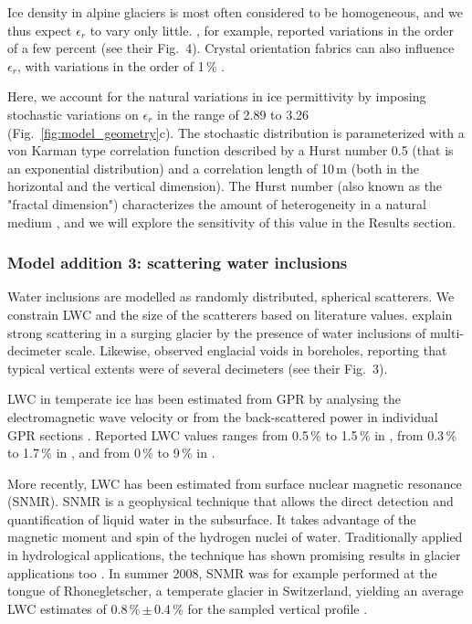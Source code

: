 Ice density in alpine glaciers is most often considered to be homogeneous, and we thus expect $\epsilon_r$ to vary only little. \citet{Bohleber2012}, for example, reported variations in the order of a few percent (see their Fig.~4). Crystal orientation fabrics can also influence $\epsilon_r$, with variations in the order of 1\,\% \citep{Johari&Charette1975,Fujita&al1993}.

Here, we account for the natural variations in ice permittivity by imposing stochastic variations on $\epsilon_r$ in the range of 2.89 to 3.26 (Fig.~\ref{fig:model_geometry}c). The stochastic distribution is parameterized with a von Karman type correlation function \citep{Goff&Holliger2012} described by a Hurst number 0.5 (that is an exponential distribution) and a correlation length of 10\,m (both in the horizontal and the vertical dimension). The Hurst number (also known as the "fractal dimension") characterizes the amount of heterogeneity in a natural medium \citep{Goff&Holliger2012}, and we will explore the sensitivity of this value in the Results section.


\subsubsection{Model addition 3: scattering water inclusions}
\label{sec:water}

Water inclusions are modelled as randomly distributed, spherical scatterers. We constrain LWC and the size of the scatterers based on literature values. \cite{Barrett&al2008} explain strong scattering in a surging glacier by the presence of water inclusions of multi-decimeter scale. Likewise, \cite{Hodge1976} observed englacial voids in boreholes, reporting that typical vertical extents were of several decimeters (see their Fig.~3).

LWC in temperate ice has been estimated from GPR by analysing the electromagnetic wave velocity \citep{Macheret&al1993,Moore&al1999,Murray&al2000} or from the back-scattered power in individual GPR sections \citep{Bamber1988,Hamran&al1996,Macheret&Glazovsky2000}. Reported LWC values ranges from 0.5\,\% to 1.5\,\% in \cite{Murray&al2000}, from 0.3\,\% to 1.7\,\% in \cite{Raymond&Harrison1975,Vallon&al1976}, and from 0\,\% to 9\,\% in \cite{Pettersson&al2004}. 

More recently, LWC has been estimated from surface nuclear magnetic resonance (SNMR). SNMR is a geophysical technique that allows the direct detection and quantification of liquid water in the subsurface. It takes advantage of the magnetic moment and spin of the hydrogen nuclei of water. Traditionally applied in hydrological applications, the technique has shown promising results in glacier applications too \citep[e.g.][]{Hertrich&al2007,Legchenko&al2011,Garambois&al2016}. In summer 2008, SNMR was for example performed at the tongue of Rhonegletscher, a temperate glacier in Switzerland, yielding an average LWC estimates of 0.8\,\%\,$\pm$\,0.4\,\% for the sampled vertical profile \citep{Hertrich&Walbrecker2008}. 

